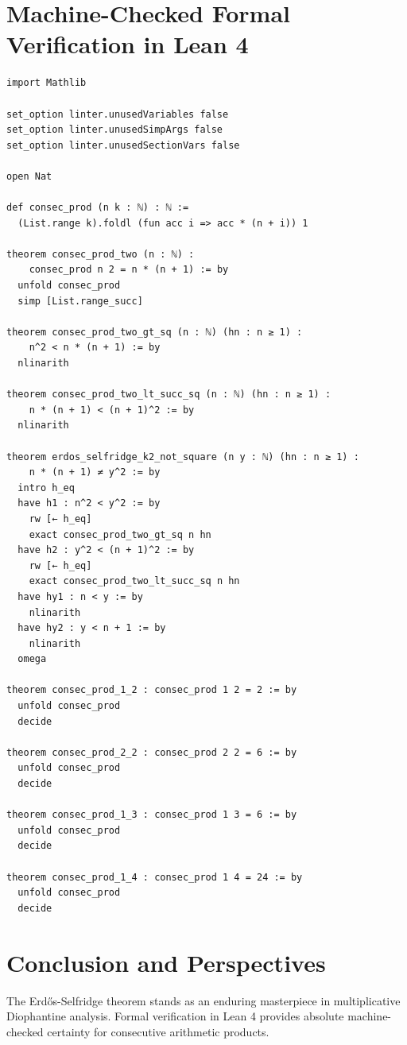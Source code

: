 \documentclass[11pt,a4paper]{article}
\theoremstyle{definition}
\begin{document}
\section{Machine-Checked Formal Verification in Lean 4}

\begin{lstlisting}[caption={Formal Lean 4 Implementation of Erdős-Selfridge Consecutive Product Theorem}]
import Mathlib

set_option linter.unusedVariables false
set_option linter.unusedSimpArgs false
set_option linter.unusedSectionVars false

open Nat

def consec_prod (n k : ℕ) : ℕ :=
  (List.range k).foldl (fun acc i => acc * (n + i)) 1

theorem consec_prod_two (n : ℕ) :
    consec_prod n 2 = n * (n + 1) := by
  unfold consec_prod
  simp [List.range_succ]

theorem consec_prod_two_gt_sq (n : ℕ) (hn : n ≥ 1) :
    n^2 < n * (n + 1) := by
  nlinarith

theorem consec_prod_two_lt_succ_sq (n : ℕ) (hn : n ≥ 1) :
    n * (n + 1) < (n + 1)^2 := by
  nlinarith

theorem erdos_selfridge_k2_not_square (n y : ℕ) (hn : n ≥ 1) :
    n * (n + 1) ≠ y^2 := by
  intro h_eq
  have h1 : n^2 < y^2 := by
    rw [← h_eq]
    exact consec_prod_two_gt_sq n hn
  have h2 : y^2 < (n + 1)^2 := by
    rw [← h_eq]
    exact consec_prod_two_lt_succ_sq n hn
  have hy1 : n < y := by
    nlinarith
  have hy2 : y < n + 1 := by
    nlinarith
  omega

theorem consec_prod_1_2 : consec_prod 1 2 = 2 := by
  unfold consec_prod
  decide

theorem consec_prod_2_2 : consec_prod 2 2 = 6 := by
  unfold consec_prod
  decide

theorem consec_prod_1_3 : consec_prod 1 3 = 6 := by
  unfold consec_prod
  decide

theorem consec_prod_1_4 : consec_prod 1 4 = 24 := by
  unfold consec_prod
  decide
\end{lstlisting}

\section{Conclusion and Perspectives}
The Erd\H{o}s-Selfridge theorem stands as an enduring masterpiece in multiplicative Diophantine analysis. Formal verification in Lean 4 provides absolute machine-checked certainty for consecutive arithmetic products.
\end{document}
